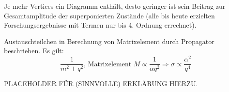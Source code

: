 \documentclass[Ex4_Zusammenfassung.tex]{subfiles}
\begin{document}
	Je mehr Vertices ein Diagramm enthält, desto geringer ist sein Beitrag zur Gesamtamplitude der superponierten Zustände (alle bis heute erzielten Forschungsergebnisse mit Termen nur bis 4. Ordnung errechnet).
	
	Austauschteilchen in Berechnung von Matrixelement durch Propagator beschrieben. Es gilt:
	\begin{equation}
		 \frac{1}{m^2 + q^2} \text{, Matrixelement } M \propto \frac{1}{\alpha q^2} \Rightarrow \sigma \propto \frac{\alpha^2}{q^4}
	\end{equation}
		
		PLACEHOLDER FÜR (SINNVOLLE) ERKLÄRUNG HIERZU.
	
\end{document}
